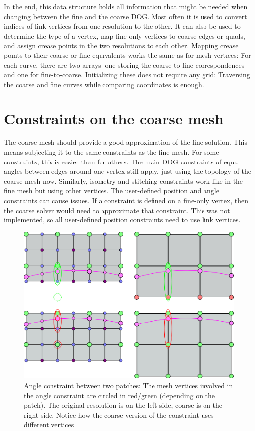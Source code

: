 \documentclass[a4paper,twoside,12pt,nochapterprefix]{scrbook}
\begin{document}
In the end, this data structure holds all information that might be needed when changing between the fine and the coarse DOG. Most often it is used to convert indices of link vertices from one resolution to the other. It can also be used to determine the type of a vertex, map fine-only vertices to coarse edges or quads, and assign crease points in the two resolutions to each other.\newline
Mapping crease points to their coarse or fine equivalents works the same as for mesh vertices: For each curve, there are two arrays, one storing the coarse-to-fine correspondences and one for fine-to-coarse. Initializing these does not require any grid: Traversing the coarse and fine curves while comparing coordinates is enough.\newline%
\section{Constraints on the coarse mesh}\label{sec:coarse_constraints}
The coarse mesh should provide a good approximation of the fine solution. This means subjecting it to the same constraints as the fine mesh. For some constraints, this is easier than for others.\newline
The main DOG constraints of equal angles between edges around one vertex still apply, just using the topology of the coarse mesh now. Similarly, isometry and stitching constraints work like in the fine mesh but using other vertices.\newline
The user-defined position and angle constraints can cause issues. If a constraint is defined on a fine-only vertex, then the coarse solver would need to approximate that constraint. This was not implemented, so all user-defined position constraints need to use link vertices.\newline
\begin{figure}
    \centering
    \includegraphics[width=0.8\linewidth]{figures/0311_coarse_angle}
    \caption{Angle constraint between two patches: The mesh vertices involved in the angle constraint are circled in red/green (depending on the patch). The original resolution is on the left side, coarse is on the right side. Notice how the coarse version of the constraint uses different vertices}
      \label{fig:angleconstraint_ftc}
\end{figure}
\end{document}
